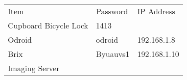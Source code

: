 \begin{longtable}[]{@{}lll@{}}
\toprule
\begin{minipage}[t]{0.30\columnwidth}\raggedright\strut
{Item}\strut
\end{minipage} & \begin{minipage}[t]{0.30\columnwidth}\raggedright\strut
{Password}\strut
\end{minipage} & \begin{minipage}[t]{0.30\columnwidth}\raggedright\strut
{IP Address}\strut
\end{minipage}\tabularnewline
\begin{minipage}[t]{0.30\columnwidth}\raggedright\strut
{Cupboard Bicycle Lock}\strut
\end{minipage} & \begin{minipage}[t]{0.30\columnwidth}\raggedright\strut
{1413}\strut
\end{minipage} & \begin{minipage}[t]{0.30\columnwidth}\raggedright\strut
{}\strut
\end{minipage}\tabularnewline
\begin{minipage}[t]{0.30\columnwidth}\raggedright\strut
{Odroid}\strut
\end{minipage} & \begin{minipage}[t]{0.30\columnwidth}\raggedright\strut
{odroid}\strut
\end{minipage} & \begin{minipage}[t]{0.30\columnwidth}\raggedright\strut
{192.168.1.8}\strut
\end{minipage}\tabularnewline
\begin{minipage}[t]{0.30\columnwidth}\raggedright\strut
{Brix}\strut
\end{minipage} & \begin{minipage}[t]{0.30\columnwidth}\raggedright\strut
{Byuauvs1}\strut
\end{minipage} & \begin{minipage}[t]{0.30\columnwidth}\raggedright\strut
{192.168.1.10}\strut
\end{minipage}\tabularnewline
\begin{minipage}[t]{0.30\columnwidth}\raggedright\strut
{Imaging Server}\strut
\end{minipage} & \begin{minipage}[t]{0.30\columnwidth}\raggedright\strut
{}\strut
\end{minipage} & \begin{minipage}[t]{0.30\columnwidth}\raggedright\strut

\end{minipage}
\end{longtable}
